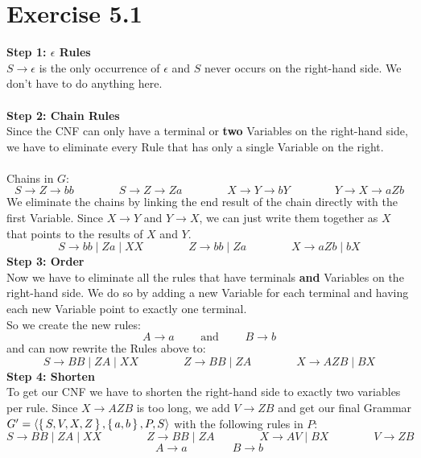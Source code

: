 \documentclass{article} %
\newcommand{\homeworkNumber}{5}
\begin{document}
\section*{Exercise \homeworkNumber.1}
\textbf{Step 1: $\epsilon$ Rules}\\
$S \to \epsilon$ is the only occurrence of $\epsilon$ and $S$ never occurs on the right-hand side. We don't have to do anything here.\\\\
\textbf{Step 2: Chain Rules}\\
Since the CNF can only have a terminal or \textbf{two} Variables on the right-hand side, we have to eliminate every Rule that has only a single Variable on the right.\\\\
Chains in $G$:
$$S \to Z \to bb \qquad \qquad S \to Z \to Za \qquad \qquad X \to Y \to bY \qquad \qquad Y \to X \to aZb$$
We eliminate the chains by linking the end result of the chain directly with the first Variable. Since $X \to Y$ and $Y \to X$, we can just write them together as $X$ that points to the results of $X$ and $Y$.
$$S \to bb \mid Za \mid XX \qquad \qquad Z \to bb \mid Za \qquad \qquad X \to aZb \mid bX$$
\textbf{Step 3: Order}\\
Now we have to eliminate all the rules that have terminals \textbf{and} Variables on the right-hand side. We do so by adding a new Variable for each terminal and having each new Variable point to exactly one terminal.\\
So we create the new rules:
$$A \to a \qquad \text{ and } \qquad B \to b$$
and can now rewrite the Rules above to:
$$S \to BB \mid ZA \mid XX \qquad \qquad Z \to BB \mid ZA \qquad \qquad X \to AZB \mid BX$$
\textbf{Step 4: Shorten}\\
To get our CNF we have to shorten the right-hand side to exactly two variables per rule. Since $X \to AZB$ is too long, we add $V \to ZB$ and get our final Grammar $G' = \left \langle \set{S, V, X, Z}, \set{a,b}, P, S \right \rangle$ with the following rules in $P$:
$$S \to BB \mid ZA \mid XX \qquad \qquad Z \to BB \mid ZA \qquad \qquad X \to AV \mid BX \qquad \qquad V \to ZB$$
$$A \to a \qquad \qquad B \to b$$

\clearpage
\end{document}
